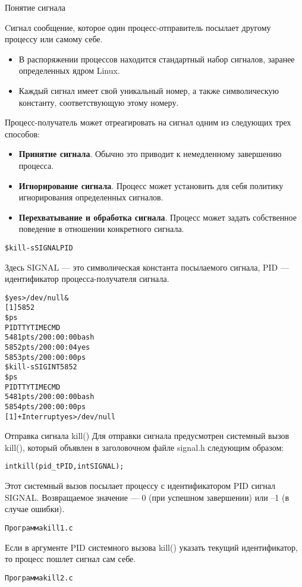 \documentclass{beamer}
\begin{document}
\begin{frame}{Понятие сигнала}
\begin{block}{Cигнал}
сообщение, которое один процесс-отправитель посылает другому процессу или самому себе.
\end{block}
\begin{itemize}
\item В распоряжении процессов находится стандартный набор сигналов, заранее определенных ядром Linux.
\item Каждый сигнал имеет свой уникальный номер, а также символическую константу, соответствующую этому номеру. 
\end{itemize}
Процесс-получатель может отреагировать на сигнал одним из следующих трех способов:
\begin{itemize}
\item \textbf{Принятие сигнала}. Обычно это приводит к немедленному завершению процесса.
\item \textbf{Игнорирование сигнала}. Процесс может установить для себя политику игнорирования определенных сигналов. 
\item \textbf{Перехватывание и обработка сигнала}. Процесс может задать собственное поведение в отношении конкретного сигнала.
\end{itemize}
\end{frame}

\begin{frame}[fragile]
\begin{alltt}
\$ kill -s SIGNAL PID
\end{alltt}
Здесь SIGNAL — это символическая константа посылаемого сигнала, PID — идентификатор процесса-получателя сигнала. 
\begin{alltt}
\$ yes > /dev/null &
[1] 5852
\$ ps
PID TTY TIME CMD
5481 pts/2 00:00:00 bash
5852 pts/2 00:00:04 yes
5853 pts/2 00:00:00 ps
\$ kill -s SIGINT 5852
\$ ps
PID TTY TIME CMD
5481 pts/2 00:00:00 bash
5854 pts/2 00:00:00 ps
[1]+ Interrupt yes >/dev/null
\end{alltt}
\end{frame}

\begin{frame}[fragile]{Отправка сигнала kill()}
Для отправки сигнала предусмотрен системный вызов kill(), который объявлен в заголовочном файле signal.h следующим образом:
\begin{alltt}
int kill (pid_t PID, int SIGNAL);
\end{alltt}
Этот системный вызов посылает процессу с идентификатором PID сигнал SIGNAL.
Возвращаемое значение — 0 (при успешном завершении) или –1 (в случае ошибки).
\begin{alltt}
Программа kill1.c
\end{alltt}
Если в аргументе PID системного вызова kill() указать текущий идентификатор, то процесс пошлет сигнал сам себе. 
\begin{alltt}
Программа kill2.c
\end{alltt}
\end{frame}
\end{document}
